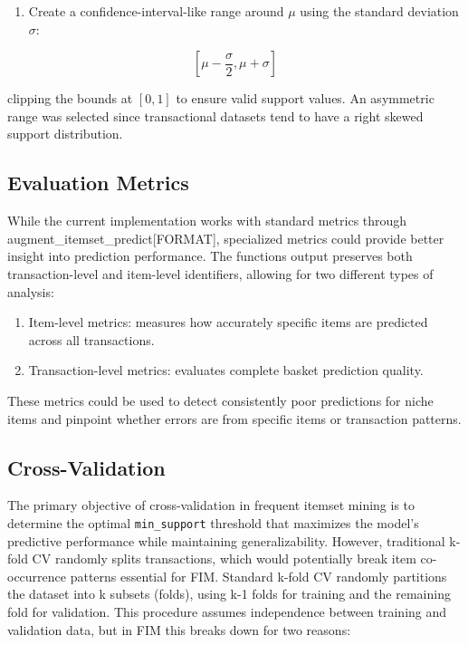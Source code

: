 \documentclass[
  article]{jss}
\providecommand{\tightlist}{%
  \setlength{\itemsep}{0pt}\setlength{\parskip}{0pt}}
\begin{document}
\begin{enumerate}
\def\labelenumi{\arabic{enumi}.}
\setcounter{enumi}{1}
\tightlist
\item
  Create a confidence-interval-like range around \(\mu\) using the
  standard deviation \(\sigma\):
\end{enumerate}

\[
[\mu - \frac{\sigma}{2}, \mu + \sigma]
\]

clipping the bounds at \([0, 1]\) to ensure valid support values. An
asymmetric range was selected since transactional datasets tend to have
a right skewed support distribution.

\subsection{Evaluation Metrics}\label{evaluation-metrics}

While the current implementation works with standard metrics through
augment\_itemset\_predict{[}FORMAT{]}, specialized metrics could provide
better insight into prediction performance. The functions output
preserves both transaction-level and item-level identifiers, allowing
for two different types of analysis:

\begin{enumerate}
\def\labelenumi{\arabic{enumi}.}
\item
  Item-level metrics: measures how accurately specific items are
  predicted across all transactions.
\item
  Transaction-level metrics: evaluates complete basket prediction
  quality.
\end{enumerate}

These metrics could be used to detect consistently poor predictions for
niche items and pinpoint whether errors are from specific items or
transaction patterns.

\subsection{Cross-Validation}\label{cross-validation}

The primary objective of cross-validation in frequent itemset mining is
to determine the optimal \texttt{min\_support} threshold that maximizes
the model's predictive performance while maintaining generalizability.
However, traditional k-fold CV randomly splits transactions, which would
potentially break item co-occurrence patterns essential for FIM.
Standard k-fold CV randomly partitions the dataset into k subsets
(folds), using k-1 folds for training and the remaining fold for
validation. This procedure assumes independence between training and
validation data, but in FIM this breaks down for two reasons:
\end{document}
